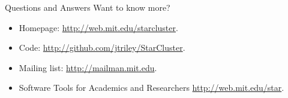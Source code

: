 \begin{frame}{Questions and Answers}
  Want to know more?
  \begin{itemize}
    \item Homepage: \url{http://web.mit.edu/starcluster}.
    \item Code: \url{http://github.com/jtriley/StarCluster}.
    \item Mailing list: \url{http://mailman.mit.edu}.
    \item Software Tools for Academics and Researchers \url{http://web.mit.edu/star}.
  \end{itemize}
\end{frame}
